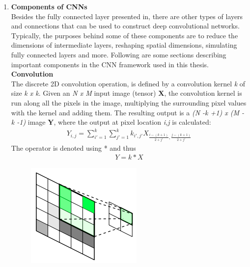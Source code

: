             \begin{enumerate}
                \item \textbf{Components of CNNs} \\ 
                    \vspace{3mm}
                    Besides the fully connected layer presented in, there are other types of
                    layers and connections that can be used to construct deep convolutional networks.
                    Typically, the purposes behind some of these components are to reduce the dimensions of intermediate layers, reshaping spatial dimensions, simulating fully connected
                    layers and more. Following are some sections describing important components in
                    the CNN framework used in this thesis. \\ 
                    \vspace{3mm}
                    \textbf{Convolution} \\ 
                    \vspace{3mm}
                    The discrete 2D convolution operation, is defined by a convolution kernel \emph{k} of size 
                    \emph{k x k}. Given an \emph{N x M} input image (tensor) \textbf{X}, the convolution kernel is run along all the pixels in the image, multiplying the
                    surrounding pixel values with the kernel and adding them. The resulting output is
                    a \emph{(N -k +1) x (M - k -1)} image \textbf{Y}, where the output at pixel location \emph{i,j} is calculated: 
                    \begin{align}
                        Y_{i,j} = \displaystyle\sum_{i'=1}^k \displaystyle\sum_{j'=1}^k k_{i',j'} X_{\frac{i - (k+1)}{2+j'}, \frac{j-(k+1)}{2+j'}}
                    \end{align}
                    The operator is denoted using * and thus 
                    \begin{align}
                        Y = k*X
                    \end{align}
                    \begin{figure}[H]
                        \centering
                        \includegraphics[width=0.4\linewidth]{img/conv_operation.png}

\end{figure}
\end{enumerate}
